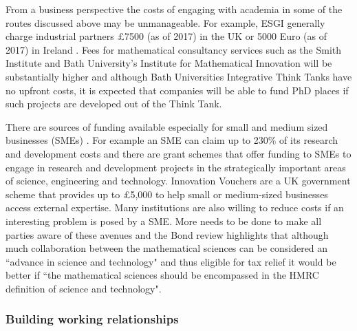\documentclass[11pt]{article} %
\begin{document}
	From a business perspective the costs of engaging with academia in some of the routes discussed above may be unmanageable. For example, ESGI generally charge industrial partners  £7500 (as of 2017) in the UK or 5000  Euro (as of 2017) in Ireland \cite{ESGIhandbook}. Fees for mathematical consultancy services such as the Smith Institute and Bath University's Institute for Mathematical Innovation will be substantially higher and although Bath Universities Integrative Think Tanks have no upfront costs, it is expected that companies will be able to fund PhD places if such projects are developed out of the Think Tank. 
	
	There are sources of funding available especially for small and medium sized businesses (SMEs) \cite{IMI}. For example an SME can claim up to 230\% of its research and development costs \cite{Gov}  and there are grant schemes that offer funding to SMEs to engage in research and development projects in the strategically important areas of science, engineering and technology. Innovation Vouchers are a UK government scheme that	provides up to £5,000 to help small or medium-sized
	businesses access external expertise. Many institutions are also willing to reduce costs if an interesting problem is posed by a SME. More needs to be done to make all parties aware of these avenues and the Bond review \cite{Bond} highlights that although much collaboration between the mathematical sciences can be considered an ``advance in science and technology" and thus eligible for tax relief it would be better if ``the mathematical sciences should be encompassed in the HMRC definition of science and technology".
	
	
	\subsubsection{Building working relationships}
	
\end{document}
